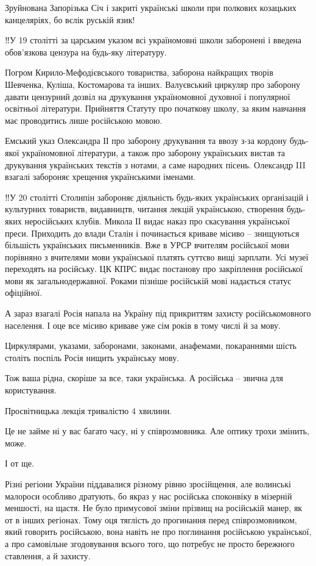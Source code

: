 Зруйнована Запорізька Січ і закриті українські школи при полкових козацьких
канцеляріях, бо вєлік руській язик!

‼️У 19 столітті за царським указом всі україномовні школи заборонені і введена
обов’язкова цензура на будь-яку літературу.

Погром Кирило-Мефодієвського товариства,  заборона найкращих творів Шевченка,
Куліша, Костомарова та інших. Валуєвський циркуляр про заборону давати
цензурний дозвіл на друкування україномовної духовної і популярної освітньої
літератури. Прийняття Статуту про початкову школу, за яким навчання має
проводитись лише російською мовою.

Емський указ Олександра ІІ про заборону друкування та ввозу з-за кордону
будь-якої україномовної літератури, а також про заборону українських вистав та
друкування українських текстів з нотами, а саме народних пісень. Олександр III
взагалі забороняє хрещення українськими іменами.

‼️У 20 столітті Столипін забороняє діяльність  будь-яких українських організацій
і культурних товариств, видавництв, читання лекцій українською, створення
будь-яких неросійських клубів. Микола ІІ видає наказ про скасування української
преси. Приходить до влади Сталін і починається криваве місиво – знищуються
більшість українських письменників. Вже в УРСР вчителям російської мови
порівняно з вчителями мови української платять суттєво вищі зарплати. Усі музеї
переходять на російську. ЦК КПРС видає постанову про закріплення російської
мови як загальнодержавної. Роками пізніше російській мові надається статус
офіційної.

А зараз взагалі Росія напала на Україну під прикриттям захисту російськомовного
населення. І оце все місиво криваве уже сім років в тому числі й за мову.

Циркулярами, указами, заборонами, законами, анафемами, покараннями шість
століть поспіль Росія нищить українську мову. 

Тож ваша рідна, скоріше за все, таки українська. А російська – звична для
користування. 

Просвітницька лекція тривалістю 4 хвилини. 

Це не займе ні у вас багато часу, ні у співрозмовника. Але оптику трохи
змінить, може.

І от ще. 

Різні регіони України піддавалися різному рівню зросійщення, але волинські
малороси особливо дратують, бо якраз у нас російська споконвіку в мізерній
меншості, на щастя. Не було примусової зміни прізвищ на російській манер, як от
в інших регіонах. Тому оця тяглість до прогинання перед співрозмовником, який
говорить російською, вона навіть не про поглинання російською української, а
про самовільне згодовування всього того, що потребує не просто бережного
ставлення, а й захисту.


